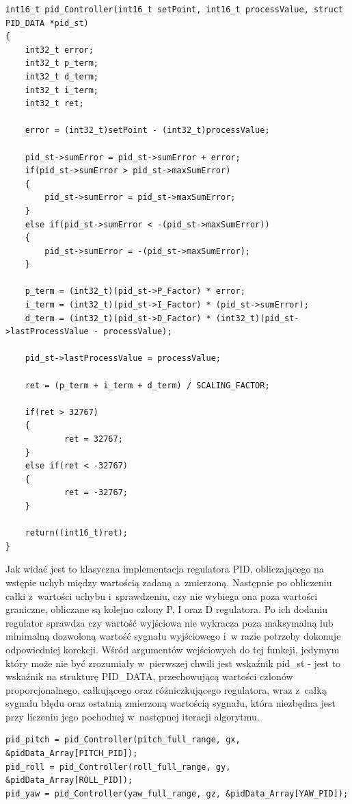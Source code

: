 \begin{lstlisting}
int16_t pid_Controller(int16_t setPoint, int16_t processValue, struct PID_DATA *pid_st)
{
	int32_t error;
	int32_t p_term;
	int32_t d_term;
	int32_t i_term; 
	int32_t ret;

  	error = (int32_t)setPoint - (int32_t)processValue;

	pid_st->sumError = pid_st->sumError + error;
	if(pid_st->sumError > pid_st->maxSumError)
	{
		pid_st->sumError = pid_st->maxSumError;
	}
	else if(pid_st->sumError < -(pid_st->maxSumError))
	{
		pid_st->sumError = -(pid_st->maxSumError);
	}
	
	p_term = (int32_t)(pid_st->P_Factor) * error;
  	i_term = (int32_t)(pid_st->I_Factor) * (pid_st->sumError);
  	d_term = (int32_t)(pid_st->D_Factor) * (int32_t)(pid_st->lastProcessValue - processValue);

  	pid_st->lastProcessValue = processValue;

  	ret = (p_term + i_term + d_term) / SCALING_FACTOR;
  
 	if(ret > 32767)
	{
    		ret = 32767;
  	}
  	else if(ret < -32767)
	{
    		ret = -32767;
  	}

  	return((int16_t)ret);
}
\end{lstlisting}

Jak widać jest to klasyczna implementacja regulatora PID, obliczającego na wstępie uchyb między wartością zadaną a~zmierzoną. Następnie po obliczeniu całki z~wartości uchybu i~sprawdzeniu, czy nie wybiega ona poza wartości graniczne, obliczane są kolejno człony P, I oraz D regulatora. Po ich dodaniu regulator sprawdza czy wartość wyjściowa nie wykracza poza maksymalną lub minimalną dozwoloną wartość sygnału wyjściowego i~w razie potrzeby dokonuje odpowiedniej korekcji. Wśród argumentów wejściowych do tej funkcji, jedymym który może nie być zrozumiały w~pierwszej chwili jest wskaźnik pid\_st - jest to wskaźnik na strukturę PID\_DATA, przechowującą wartości członów proporcjonalnego, całkującego oraz różniczkującego regulatora, wraz z~całką sygnału błędu oraz ostatnią zmierzoną wartością sygnału, która niezbędna jest przy liczeniu jego pochodnej w~następnej iteracji algorytmu.

\begin{lstlisting}
pid_pitch = pid_Controller(pitch_full_range, gx, &pidData_Array[PITCH_PID]);
pid_roll = pid_Controller(roll_full_range, gy, &pidData_Array[ROLL_PID]);
pid_yaw = pid_Controller(yaw_full_range, gz, &pidData_Array[YAW_PID]);
\end{lstlisting}

